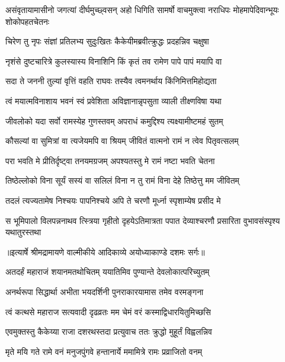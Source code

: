 \threelineshloka
{असंवृतायामासीनो जगत्यां दीर्घमुच्छ्वसन्}
{अहो धिगिति सामर्षो वाचमुक्त्वा नराधिपः}
{मोहमापेदिवान्भूयः शोकोपहतचेतनः} %

\twolineshloka
{चिरेण तु नृपः संज्ञां प्रतिलभ्य सुदुःखितः}
{कैकेयीमब्रवीत्क्रुद्धः प्रदहन्निव चक्षुषा} %

\twolineshloka
{नृशंसे दुष्टचारित्रे कुलस्यास्य विनाशिनि}
{किं कृतं तव रामेण पापे पापं मयापि वा} %

\twolineshloka
{सदा ते जननी तुल्यां वृत्तिं वहति राघवः}
{तस्यैव त्वमनर्थाय किंनिमित्तमिहोद्यता} %

\twolineshloka
{त्वं मयात्मविनाशाय भवनं स्वं प्रवेशिता}
{अविज्ञानान्नृपसुता व्याली तीक्ष्णविषा यथा} %

\twolineshloka
{जीवलोको यदा सर्वो रामस्येह गुणस्तवम्}
{अपराधं कमुद्दिश्य त्यक्ष्यामीष्टमहं सुतम्} %

\twolineshloka
{कौसल्यां वा सुमित्रां वा त्यजेयमपि वा श्रियम्}
{जीवितं वात्मनो रामं न त्वेव पितृवत्सलम्} %

\twolineshloka
{परा भवति मे प्रीतिर्दृष्ट्वा तनयमग्रजम्}
{अपश्यतस्तु मे रामं नष्टा भवति चेतना} %

\twolineshloka
{तिष्ठेल्लोको विना सूर्यं सस्यं वा सलिलं विना}
{न तु रामं विना देहे तिष्ठेत्तु मम जीवितम्} %

\twolineshloka
{तदलं त्यज्यतामेष निश्चयः पापनिश्चये}
{अपि ते चरणौ मूर्ध्ना स्पृशाम्येष प्रसीद मे} %

\fourlineindentedshloka
{स भूमिपालो विलपन्ननाथव}
{त्स्त्रिया गृहीतो दृहयेऽतिमात्रता}
{पपात देव्याश्चरणौ प्रसारिता}
{वुभावसंस्पृश्य यथातुरस्तथा} %


{॥इत्यार्षे श्रीमद्रामायणे वाल्मीकीये आदिकाव्ये अयोध्याकाण्डे दशमः सर्गः॥}


\twolineshloka
{अतदर्हं महाराजं शयानमतथोचितम्}
{ययातिमिव पुण्यान्ते देवलोकात्परिच्युतम्} %

\twolineshloka
{अनर्थरूपा सिद्धार्था अभीता भयदर्शिनी}
{पुनराकारयामास तमेव वरमङ्गना} %

\twolineshloka
{त्वं कत्थसे महाराज सत्यवादी दृढव्रतः}
{मम चेमं वरं कस्माद्विधारयितुमिच्छसि} %

\twolineshloka
{एवमुक्तस्तु कैकेय्या राजा दशरथस्तदा}
{प्रत्युवाच ततः क्रुद्धो मुहूर्तं विह्वलन्निव} %

\twolineshloka
{मृते मयि गते रामे वनं मनुजपुंगवे}
{हन्तानार्ये ममामित्रे रामः प्रव्राजितो वनम्} %

